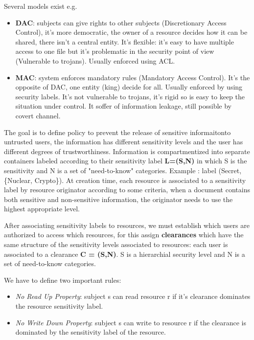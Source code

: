 \FloatBarrier

Several models exist e.g.
\begin{itemize}
    \item \textbf{DAC}: subjects can give rights to other subjects (Discretionary Access Control), it's more democratic, the owner of a resource decides how it can be shared, there isn't a central entity. It's flexible: it's easy to have multiple access to one file but it's problematic in the security point of view (Vulnerable to trojans). Usually enforced using ACL.
    \item \textbf{MAC}: system enforces mandatory rules (Mandatory Access Control). It's the opposite of DAC, one entity (king) decide for all. Usually enforced by using security labels. It's not vulnerable to trojans, it's rigid so is easy to keep the situation under control. It soffer of information leakage, still possible by covert channel.
\end{itemize}

The goal is to define policy to prevent the release of sensitive informaitonto untrusted users, the information has different sensitivity levels and the user has different degrees of trustworthiness. Information is compartmentized into separate containers labeled according to their sensitivity label \textbf{L=(S,N)} in which S is the sensitivity and N is a set of "need-to-know" categories. Example : label (Secret, \{Nuclear, Crypto\}). At creation time, each resource is associated to a sensitivity label by resource originator according to some criteria, when a document contains both sensitive and non-sensitive information, the originator needs to use the highest appropriate level.

After associating sensitivity labels to resources, we must establish which users are authorized to access which resources, for this assign \textbf{clearances} which have the same structure of the sensitivity levels associated to resources: each user is associated to a clearance \textbf{C = (S,N)}. S is a hierarchial security level and N is a set of need-to-know categories.

We have to define two important rules:
\begin{itemize}
    \item \textit{No Read Up Property}: subject s can read resource r if it's clearance dominates the resource sensitivity label.
    \item \textit{No Write Down Property}: subject s can write to resource r if the clearance is dominated by the sensitivity label of the resource.
\end{itemize}

